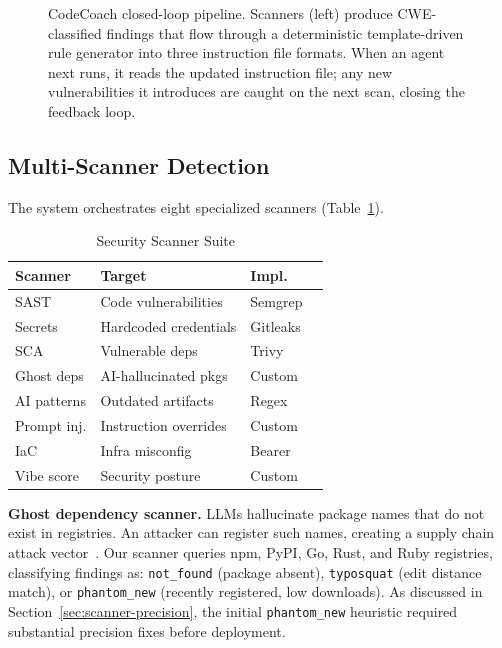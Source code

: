 \documentclass[conference,10pt]{IEEEtran}
\begin{document}
\begin{figure}[h]
\caption{CodeCoach closed-loop pipeline. Scanners (left) produce CWE-classified findings that flow through a deterministic template-driven rule generator into three instruction file formats. When an agent next runs, it reads the updated instruction file; any new vulnerabilities it introduces are caught on the next scan, closing the feedback loop.}
\label{fig:pipeline}
\end{figure}

\subsection{Multi-Scanner Detection}

The system orchestrates eight specialized scanners (Table~\ref{tab:scanners}).

\begin{table}[h]
\centering
\caption{Security Scanner Suite}
\label{tab:scanners}
\begin{tabular}{llll}
\toprule
\textbf{Scanner} & \textbf{Target} & \textbf{Impl.} \\
\midrule
SAST & Code vulnerabilities & Semgrep \\
Secrets & Hardcoded credentials & Gitleaks \\
SCA & Vulnerable deps & Trivy \\
Ghost deps & AI-hallucinated pkgs & Custom \\
AI patterns & Outdated artifacts & Regex \\
Prompt inj. & Instruction overrides & Custom \\
IaC & Infra misconfig & Bearer \\
Vibe score & Security posture & Custom \\
\bottomrule
\end{tabular}
\end{table}

\textbf{Ghost dependency scanner.} LLMs hallucinate package names that do not exist in registries. An attacker can register such names, creating a supply chain attack vector~\cite{lanyado-ghost}. Our scanner queries npm, PyPI, Go, Rust, and Ruby registries, classifying findings as: \texttt{not\_found} (package absent), \texttt{typosquat} (edit distance match), or \texttt{phantom\_new} (recently registered, low downloads). As discussed in Section~\ref{sec:scanner-precision}, the initial \texttt{phantom\_new} heuristic required substantial precision fixes before deployment.
\end{document}
